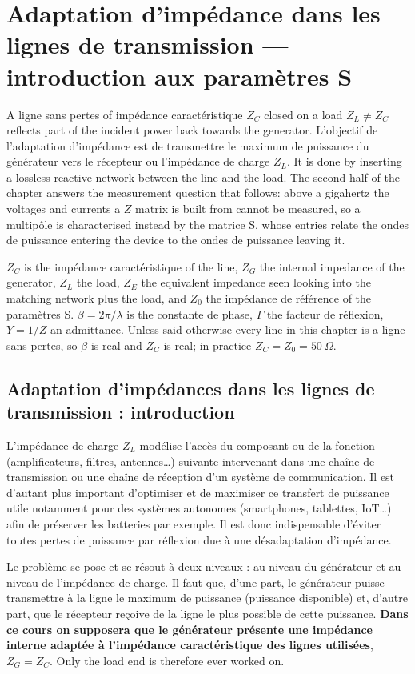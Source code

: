 \section{Adaptation d'impédance dans les lignes de transmission --- introduction aux paramètres S}
A ligne sans pertes of impédance caractéristique $Z_C$ closed on a load $Z_L \neq Z_C$
reflects part of the incident power back towards the generator. L'objectif de
l'adaptation d'impédance est de transmettre le maximum de puissance du générateur
vers le récepteur ou l'impédance de charge $Z_L$. It is done by inserting a lossless
reactive network between the line and the load.
The second half of the chapter answers the measurement question that follows: above
a gigahertz the voltages and currents a $Z$ matrix is built from cannot be measured,
so a multipôle is characterised instead by the matrice S, whose entries relate the
ondes de puissance entering the device to the ondes de puissance leaving it.

\begin{notation}
  $Z_C$ is the impédance caractéristique of the line, $Z_G$ the internal impedance of
  the generator, $Z_L$ the load, $Z_E$ the equivalent impedance seen looking into the
  matching network plus the load, and $Z_0$ the impédance de référence of the
  paramètres S. $\beta = 2\pi/\lambda$ is the constante de phase, $\Gamma$ the facteur
  de réflexion, $Y = 1/Z$ an admittance. Unless said otherwise every line in this
  chapter is a ligne sans pertes, so $\beta$ is real and $Z_C$ is real; in practice
  $Z_C = Z_0 = 50\ \Omega$.
\end{notation}

\subsection{Adaptation d'impédances dans les lignes de transmission : introduction}
L'impédance de charge $Z_L$ modélise l'accès du composant ou de la fonction
(amplificateurs, filtres, antennes\dots) suivante intervenant dans une chaîne de
transmission ou une chaîne de réception d'un système de communication. Il est d'autant
plus important d'optimiser et de maximiser ce transfert de puissance utile notamment
pour des systèmes autonomes (smartphones, tablettes, IoT\dots) afin de préserver les
batteries par exemple. Il est donc indispensable d'éviter toutes pertes de puissance
par réflexion due à une désadaptation d'impédance.

Le problème se pose et se résout à deux niveaux : au niveau du générateur et au niveau
de l'impédance de charge. Il faut que, d'une part, le générateur puisse transmettre à
la ligne le maximum de puissance (puissance disponible) et, d'autre part, que le
récepteur reçoive de la ligne le plus possible de cette puissance. \textbf{Dans ce
cours on supposera que le générateur présente une impédance interne adaptée à
l'impédance caractéristique des lignes utilisées}, $Z_G = Z_C$. Only the load end is
therefore ever worked on.

